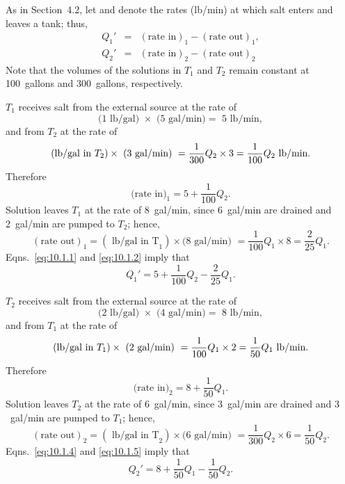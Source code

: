 \documentclass{ximera}
\begin{document}
\begin{example}
\begin{explanation}
As in Section~4.2, let  and  denote the rates (lb/min) at which salt enters and leaves a tank;
thus,
\begin{eqnarray*}
Q_1'&=&(\mbox{rate in})_1-(\mbox{rate out})_1,\\
Q_2'&=&(\mbox{rate in})_2-(\mbox{rate out})_2
\end{eqnarray*}
Note that the volumes of the solutions in $T_1$ and $T_2$
remain constant at 100~gallons and 300~gallons, respectively.

$T_1$ receives salt from the external source at the rate of
$$
\mbox{(1 lb/gal) }\times\mbox{ (5~gal/min)}=\mbox{ 5 lb/min},
$$
and from $T_2$ at the rate of
$$
\mbox{(lb/gal in }T_2)\times\mbox{ (3~gal/min)
}=\frac{1}{300}Q_2\times3\\=\frac{1}{100}Q_2 \mbox{ lb/min}.
$$
Therefore
\begin{equation} \label{eq:10.1.1}
\mbox{(rate in)}_1= 5+\frac{1}{100}Q_2.
\end{equation}
Solution leaves $T_1$  at the rate of 8~gal/min, since 6~gal/min are
drained and 2~gal/min are pumped to $T_2$; hence,
\begin{equation} \label{eq:10.1.2}
(\mbox{rate out})_1=(\mbox{ lb/gal in T}_1)\times \mbox{(8~gal/min) }
=\frac{1}{100}Q_1\times8=\frac{2}{25}Q_1.
\end{equation}
Eqns.~\eqref{eq:10.1.1} and \eqref{eq:10.1.2}  imply that
\begin{equation} \label{eq:10.1.3}
Q_1'=5+\frac{1}{100}Q_2-\frac{2}{25}Q_1.
\end{equation}

$T_2$ receives salt from the external source at the rate of
$$
\mbox{(2 lb/gal) }\times\mbox{ (4~gal/min)}=\mbox{ 8 lb/min},
$$
and from $T_1$ at the rate of
$$
\mbox{(lb/gal in }T_1)\times\mbox{ (2~gal/min)
}=\frac{1}{100}Q_1\times 2\\=\frac{1}{50}Q_1 \mbox{ lb/min}.
$$
Therefore
\begin{equation} \label{eq:10.1.4}
\mbox{(rate in)}_2= 8+\frac{1}{50}Q_1.
\end{equation}
Solution leaves $T_2$  at the rate of $6$~gal/min, since $3$~gal/min are
drained and $3$~gal/min are pumped to $T_1$; hence,
\begin{equation} \label{eq:10.1.5}
(\mbox{rate out})_2=(\mbox{ lb/gal in T}_2)\times \mbox{(6~gal/min) }
=\frac{1}{300}Q_2\times6=\frac{1}{50}Q_2.
\end{equation}
Eqns.~\eqref{eq:10.1.4} and \eqref{eq:10.1.5} imply that
\begin{equation} \label{eq:10.1.6}
Q_2'=8+\frac{1}{50}Q_1-\frac{1}{50}Q_2.
\end{equation}


\end{explanation}
\end{example}
\end{document}
